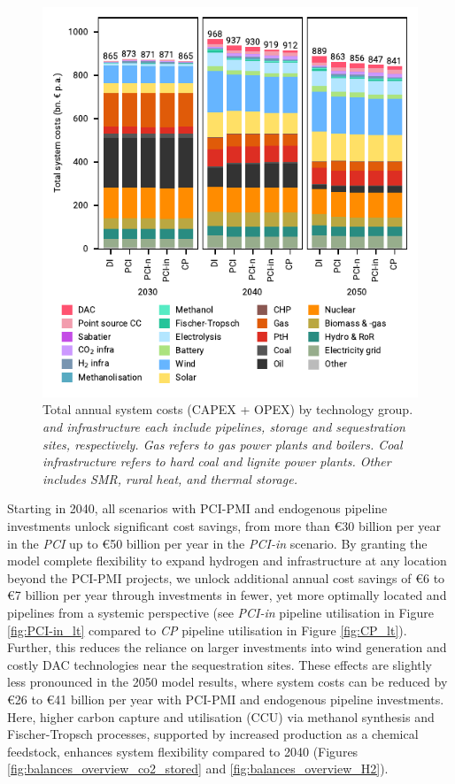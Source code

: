 \documentclass[preprint,12pt,sort&compress]{elsarticle}
\begin{document}
\begin{figure}[t]
  \centering
  \includegraphics{costs_overview.pdf}
  \caption{Total annual system costs (CAPEX + OPEX) by technology group. \textit{ and  infrastructure each include pipelines, storage and sequestration sites, respectively. Gas refers to gas power plants and boilers. Coal infrastructure refers to hard coal and lignite power plants. Other includes SMR, rural heat, and thermal storage.}}
  \label{fig:costs_overview}
\end{figure}

Starting in 2040, all scenarios with PCI-PMI and endogenous pipeline investments unlock significant cost savings, from more than \euro{30} billion per year in the \textit{PCI} up to \euro{50} billion per year in the \textit{PCI-in} scenario. 
By granting the model complete flexibility to expand hydrogen and  infrastructure at any location beyond the PCI-PMI projects, we unlock additional annual cost savings of \euro{6} to \euro{7} billion per year through investments in fewer, yet more optimally located  and  pipelines from a systemic perspective (see \textit{PCI-in} pipeline utilisation in Figure \ref{fig:PCI-in_lt} compared to \textit{CP} pipeline utilisation in Figure \ref{fig:CP_lt}).
Further, this reduces the reliance on larger investments into wind generation and costly DAC technologies near the sequestration sites. These effects are slightly less pronounced in the 2050 model results, where system costs can be reduced by \euro{26} to \euro{41} billion per year with PCI-PMI and endogenous pipeline investments. Here, higher carbon capture and utilisation (CCU) via methanol synthesis and Fischer-Tropsch processes, supported by increased  production as a chemical feedstock, enhances system flexibility compared to 2040 (Figures \ref{fig:balances_overview_co2_stored} and \ref{fig:balances_overview_H2}).
\end{document}
